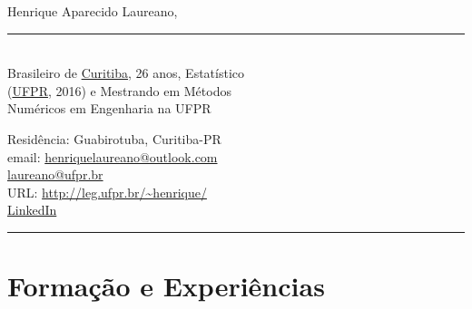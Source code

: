 \documentclass[12pt]{article}
\newcommand{\horrule}[1]{\noindent\rule{\linewidth}{#1}}
\begin{document}
\noindent
\begin{minipage}[t]{.565\textwidth}
 \raggedright
 \large Henrique Aparecido Laureano,
 \noindent\rule{.85\linewidth}{1pt}\\
 \normalsize
 Brasileiro de \href{https://goo.gl/K1Qcdv}{\color{blue}Curitiba}, 26 anos,
 Estat\'{i}stico\\ (\href{https://goo.gl/DtVAbi}{\color{blue}UFPR}, 2016) e
 Mestrando em M\'{e}todos\\ Num\'{e}ricos em Engenharia na UFPR
\end{minipage}%
\begin{minipage}[t]{.435\textwidth}
 \raggedright
 Resid\^{e}ncia: Guabirotuba, Curitiba-PR\\
 email:
 \href{mailto:henriquelaureano@outlook.com}{\color{blue}henriquelaureano@outlook.com}\\
 \hspace{1.2cm}
 \href{mailto:laureano@ufpr.br}{\color{blue}laureano@ufpr.br}\\
 URL: \url{http://leg.ufpr.br/~henrique/}\\
 \href{https://www.linkedin.com/in/henrique-laureano-025328179}{
  \color{blue}LinkedIn}
\end{minipage}

\vspace{.5cm}
\horrule{1pt}

\section*{Forma\c{c}\~{a}o e Experi\^{e}ncias}
\end{document}
